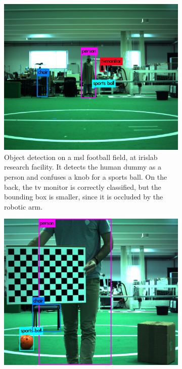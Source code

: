\begin{figure}[ht]
	\centering
	\begin{subfigure}[t]{0.45\textwidth}
		\includegraphics[width=\textwidth]{img/object-detection/experimental-2.jpg}
		\caption{Object detection on a \ac{msl} football field, at \ac{irislab} research facility.  It detects the human dummy as a person and confuses a knob for a sports ball. On the back, the \ac{tv} monitor is correctly classified, but the bounding box is smaller, since it is occluded by the robotic arm.}
		\label{fig:experimental-yolo-2}
	\end{subfigure}
	\qquad
	\begin{subfigure}[t]{0.45\textwidth}
		\includegraphics[width=\textwidth]{img/object-detection/experimental-1.jpg}

\end{subfigure}
\end{figure}
